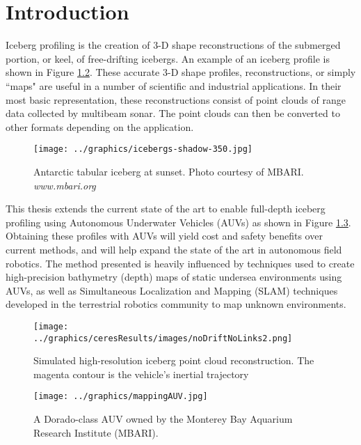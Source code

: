 
\chapter{Introduction}
\label{ch.Introduction}

Iceberg profiling is the creation of 3-D shape reconstructions of the submerged portion, or keel, of free-drifting icebergs. An example of an iceberg profile is shown in Figure \ref{fig:idealMap}. These accurate 3-D shape profiles, reconstructions, or simply ``maps" are useful in a number of scientific and industrial applications.  In their most basic representation, these reconstructions consist of point clouds of range data collected by multibeam sonar. The point clouds can then be converted to other formats depending on the application.

\begin{figure}[!htb]
   \centering
   \texttt{[image: ../graphics/icebergs-shadow-350.jpg]} %
   \caption{Antarctic tabular iceberg at sunset. Photo courtesy of MBARI. \emph{www.mbari.org}}
   \label{fig:IcebergSunset}
\end{figure}

This thesis extends the current state of the art to enable full-depth iceberg profiling using Autonomous Underwater Vehicles (AUVs) as shown in Figure \ref{fig:AUVdorado1}. Obtaining these profiles with AUVs will yield cost and safety benefits over current methods, and will help expand the state of the art in autonomous field robotics. The method presented is heavily influenced by techniques used to create high-precision bathymetry (depth) maps of static undersea environments using AUVs, as well as Simultaneous Localization and Mapping (SLAM) techniques developed in the terrestrial robotics community to map unknown environments.

\begin{figure}[!htb]
   \centering
   \texttt{[image: ../graphics/ceresResults/images/noDriftNoLinks2.png]} %
   \caption{Simulated high-resolution iceberg point cloud reconstruction. The magenta contour is the vehicle's inertial trajectory}
   \label{fig:idealMap}
\end{figure}

\begin{figure}[htb]
   \centering
   \texttt{[image: ../graphics/mappingAUV.jpg]} %
   \caption{A Dorado-class AUV owned by the Monterey Bay Aquarium Research Institute (MBARI).}
   \label{fig:AUVdorado1}
\end{figure}

